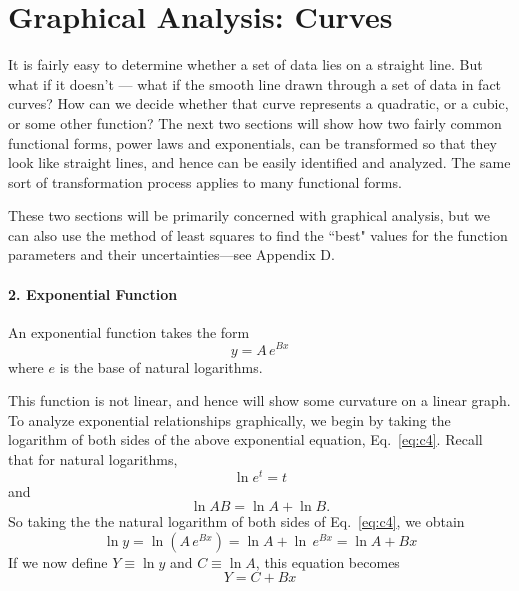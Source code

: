\section*{Graphical Analysis: Curves}


    It is fairly easy to determine whether a set of data lies on
a straight line.  But what if it doesn't --- what if the smooth line
drawn through a set of data in fact curves?  How can we
decide whether that curve represents a quadratic, or a cubic, or
some other function?  The next two sections will show
how two fairly common functional forms, power laws and
exponentials, can be transformed so that they look like straight
lines, and hence can be easily identified and analyzed.  The
same sort of transformation process applies to many functional forms.

    These two sections will be primarily concerned with graphical
analysis, but we can also use the method of least squares to find the
``best" values for the function parameters and their
uncertainties---see Appendix D.

\paragraph*{2.  Exponential Function}
\label{exprel}
An exponential function takes the form
\begin{equation}
y = A\, e^{Bx}     \label{eq:c4}
\end{equation}
where $e$ is the base of natural logarithms.

This function is not linear, and hence will
show some curvature on a linear graph.
     To  analyze exponential relationships graphically, we
begin by taking the logarithm of both sides of  the above
exponential equation, Eq.~\ref{eq:c4}.
Recall that for natural logarithms,
\[
\ln e^{t}  = t
\]
and
\[
\ln AB = \ln A + \ln B .
\]
So taking the the natural logarithm of both sides of
Eq.~\ref{eq:c4}, we obtain
\begin{equation}
\ln y = \ln(A \, e^{Bx}) = \ln A + \ln \, e^{Bx}
   = \ln A + Bx   \label{eq:c5}
\end{equation}
If we now define $Y \equiv \ln y$ and $C \equiv \ln A$, this
equation becomes 
\begin{equation}
Y = C + Bx \label{eq:transform_line}
\end{equation}


